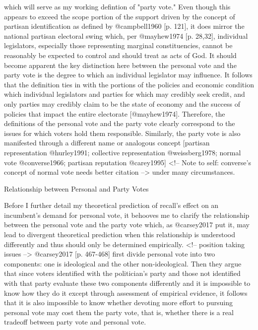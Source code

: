 \documentclass[hyphens, crop=false]{standalone}
\begin{document}
		which will serve as my working defintion of "party vote." Even though this appears to exceed the scope portion of the support driven by the concept of partisan identification as defined by @campbell1960 [p. 121],
		it does mirror the national partisan electoral swing which,
		per @mayhew1974 [p. 28,32],
		individual legislators,
		especially those representing marginal constituencies,
		cannot be reasonably be expected to control and should treat as acts of God. It should become apparent the key distinction here between the personal vote and the party vote is the degree to which an individual legislator may influence. It follows that the definition ties in with the portions of the policies and economic condition which individual legislators and parties for which may credibly seek credit,
		and only parties may credibly claim to be the state of economy and the success of policies that impact the entire electorate [@mayhew1974]. Therefore,
		the definitions of the personal vote and the party vote clearly correspond to the issues for which voters hold them responsible. Similarly,
		the party vote is also manifested through a different name or analogous concept [partisan representation @hurley1991; collective representation @weissberg1978; normal vote @converse1966; partisan reputation @carey1995] <!-- Note to self: converse's concept of normal vote needs better citation --> under many circumstances.
	
		Relationship between Personal and Party Votes
	
	
		Before I further detail my theoretical prediction of recall's effect on an incumbent's demand for personal vote,
		it behooves me to clarify the relationship between the personal vote and the party vote which,
		as @carsey2017 put it,
		may lead to divergent theoretical prediction when this relationship is understood differently and thus should only be determined empirically.
		<!-- position taking issues -->
		@carsey2017 [p. 467-468] first divide personal vote into two components:
		one is ideological and the other non-ideological.
		Then they argue that since voters identified with the politician's party and those not identified with that party evaluate these two components differently
		and it is impossible to know how they do it except through assessment of empirical evidence,
		it follows that it is also impossible to know whether devoting more effort to pursuing personal vote may cost them the party vote,
		that is,
		whether there is a real tradeoff between party vote and personal vote.
	
\end{document}
